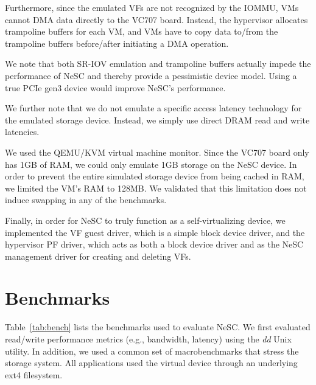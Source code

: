 Furthermore, since the emulated VFs are not recognized by the IOMMU, VMs cannot DMA data directly to the VC707 board. Instead, the hypervisor allocates trampoline buffers for each VM, and VMs have to copy data to/from the trampoline buffers before/after initiating a DMA operation.

We note that both SR-IOV emulation and trampoline buffers actually impede the performance of NeSC and thereby provide a pessimistic device model. Using a true PCIe gen3 device would improve NeSC's performance.

We further note that we do not emulate a specific access latency technology for the emulated storage device. Instead, we simply use direct DRAM read and write latencies.

We used the QEMU/KVM virtual machine monitor. Since the VC707 board only has 1GB of RAM, we could only emulate 1GB storage on the NeSC device. In order to prevent the entire simulated storage device from being cached in RAM, we limited the VM's RAM to 128MB. We validated that this limitation does not induce swapping in any of the benchmarks.

Finally, in order for NeSC to truly function as a self-virtualizing device, we implemented the VF guest driver, which is a simple block device driver,
and the hypervisor PF driver, which acts as both a block device driver and as the NeSC management driver for creating and deleting VFs.  

\section*{Benchmarks}
Table~\ref{tab:bench} lists the benchmarks used to evaluate NeSC.
We first evaluated read/write performance metrics (e.g., bandwidth, latency) using the \emph{dd} Unix utility.
In addition, we used a common set of macrobenchmarks that stress the storage system.
All applications used the virtual device through an underlying ext4 filesystem.

